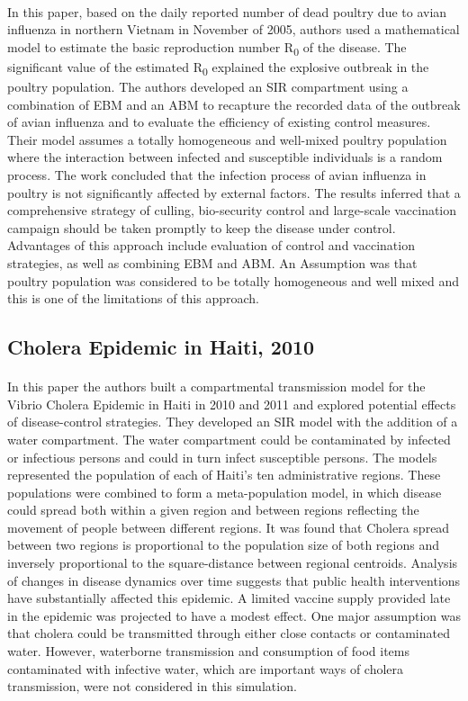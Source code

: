 \documentclass[14pt, a4paper]{extarticle}
\begin{document}
            \paragraph{} In this paper, based on the daily reported number of dead poultry due to avian influenza in northern Vietnam in November of 2005, authors used a mathematical model to estimate the basic reproduction number R\textsubscript{0} of the disease. The significant value of the estimated R\textsubscript{0} explained the explosive outbreak in the poultry population. The authors developed an SIR compartment using a combination of EBM and an ABM to recapture the recorded data of the outbreak of avian influenza and to evaluate the efficiency of existing control measures. Their model assumes a totally homogeneous and well-mixed poultry population where the interaction between infected and susceptible individuals is a random process. The work concluded that the infection process of avian influenza in poultry is not significantly affected by external factors. The results inferred that a comprehensive strategy of culling, bio-security control and large-scale vaccination campaign should be taken promptly to keep the disease under control. Advantages of this approach include evaluation of control and vaccination strategies, as well as combining EBM and ABM. An Assumption was that poultry population was considered to be totally homogeneous and well mixed and this is one of the limitations of this approach.
            
        \subsection{Cholera Epidemic in Haiti, 2010}
            \paragraph{} In this paper the authors built a compartmental transmission model for the Vibrio Cholera Epidemic in Haiti in 2010 and 2011 and explored potential effects of disease-control strategies. They developed an SIR model with the addition of a water compartment. The water compartment could be contaminated by infected or infectious persons and could in turn infect susceptible persons. The models represented the population of each of Haiti’s ten administrative regions. These populations were combined to form a meta-population model, in which disease could spread both within a given region and between regions reflecting the movement of people between different regions. It was found that Cholera spread between two regions is proportional to the population size of both regions and inversely proportional to the square-distance between regional centroids. Analysis of changes in disease dynamics over time suggests that public health interventions have substantially affected this epidemic. A limited vaccine supply provided late in the epidemic was projected to have a modest effect. One major assumption was that cholera could be transmitted through either close contacts or contaminated water. However, waterborne transmission and consumption of food items contaminated with infective water, which are important ways of cholera transmission, were not considered in this simulation.
            
\end{document}

